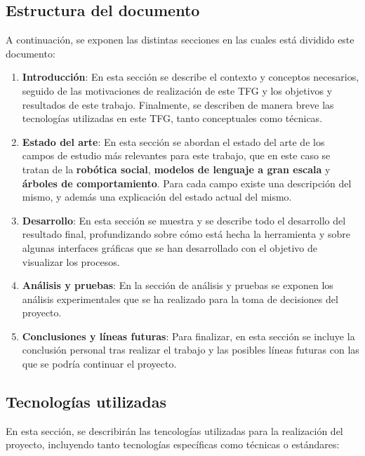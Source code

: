 \documentclass[../main.tex]{subfiles}
\begin{document}
\subsection{Estructura del documento}
A continuación, se exponen las distintas secciones en las cuales está dividido este documento:

\begin{enumerate}
    \item \textbf{Introducción}: En esta sección se describe el contexto y conceptos necesarios, seguido de las motivaciones de realización de este TFG y los objetivos
    y resultados de este trabajo. Finalmente, se describen de manera breve las tecnologías utilizadas en este TFG, tanto conceptuales como técnicas.

    \item \textbf{Estado del arte}: En esta sección se abordan el estado del arte de los campos de estudio más relevantes para este trabajo, que en este caso se tratan de la 
    \textbf{robótica social}, \textbf{modelos de lenguaje a gran escala} y \textbf{árboles de comportamiento}. Para cada campo existe una descripción del mismo, y además una explicación del estado
    actual del mismo.

    \item \textbf{Desarrollo}: En esta sección se muestra y se describe todo el desarrollo del resultado final, profundizando sobre cómo está hecha la herramienta y sobre algunas
    interfaces gráficas que se han desarrollado con el objetivo de visualizar los procesos.

    \item \textbf{Análisis y pruebas}: En la sección de análisis y pruebas se exponen los análisis experimentales que se ha realizado para la toma de decisiones del proyecto.

    \item \textbf{Conclusiones y líneas futuras}: Para finalizar, en esta sección se incluye la conclusión personal tras realizar el trabajo y las posibles líneas futuras con las que
    se podría continuar el proyecto.
\end{enumerate}

\subsection{Tecnologías utilizadas}
En esta sección, se describirán las tencologías utilizadas para la realización del proyecto, incluyendo tanto tecnologías específicas como técnicas o estándares:
\end{document}
